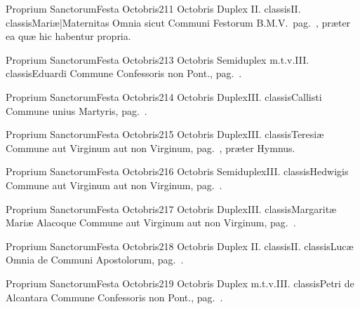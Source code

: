 \documentclass[nocturnale-romanum.tex]{subfiles}
\begin{document}
	{Proprium Sanctorum}{Festa Octobris}{2}{11 Octobris}
	{Duplex II. classis}{II. classis}{Mariæ|Maternitas}
	{Omnia sicut Communi Festorum B.M.V.\ pag.\ \pageref{M-CBMV}, præter ea quæ hic habentur propria.}
	{}
\tedeumrubric

	{Proprium Sanctorum}{Festa Octobris}{2}{13 Octobris}
	{Semiduplex m.t.v.}{III. classis}{Eduardi}
	{Commune Confessoris non Pont., pag.\ \pageref{M-CONP}.}
	{}

	{Proprium Sanctorum}{Festa Octobris}{2}{14 Octobris}
	{Duplex}{III. classis}{Callisti}
	{Commune unius Martyris, pag.\ \pageref{M-UMEX}.}
	{}

	{Proprium Sanctorum}{Festa Octobris}{2}{15 Octobris}
	{Duplex}{III. classis}{Teresiæ}
	{Commune aut Virginum aut non Virginum, pag.\ \pageref{M-MU}, præter Hymnus.}
	{}

	{Proprium Sanctorum}{Festa Octobris}{2}{16 Octobris}
	{Semiduplex}{III. classis}{Hedwigis}
	{Commune aut Virginum aut non Virginum, pag.\ \pageref{M-MU}.}
	{}

	{Proprium Sanctorum}{Festa Octobris}{2}{17 Octobris}
	{Duplex}{III. classis}{Margaritæ Mariæ Alacoque}
	{Commune aut Virginum aut non Virginum, pag.\ \pageref{M-MU}.}
	{}

	{Proprium Sanctorum}{Festa Octobris}{2}{18 Octobris}
	{Duplex II. classis}{II. classis}{Lucæ}
	{Omnia de Communi Apostolorum, pag.\ \pageref{M-APEX}.}
	{}

	{Proprium Sanctorum}{Festa Octobris}{2}{19 Octobris}
	{Duplex m.t.v.}{III. classis}{Petri de Alcantara}
	{Commune Confessoris non Pont., pag.\ \pageref{M-CONP}.}
	{}
\end{document}
